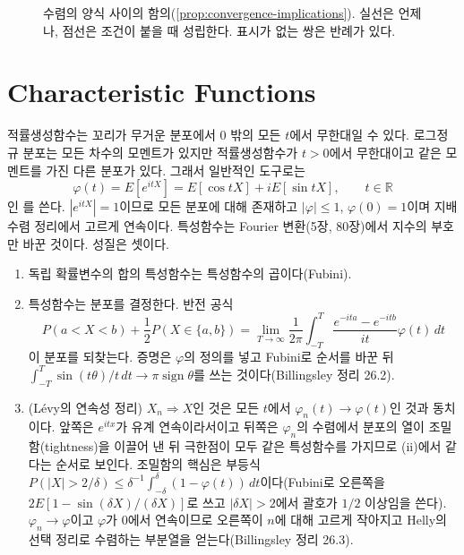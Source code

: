 \begin{figure}[htbp]
\centering
{}
\caption{수렴의 양식 사이의 함의(\cref{prop:convergence-implications}). 실선은 언제나, 점선은 조건이 붙을 때 성립한다. 표시가 없는 쌍은 반례가 있다.}
\label{fig:convergence}
\end{figure}

\section{Characteristic Functions}
\label{sec:characteristic-function}

적률생성함수는 꼬리가 무거운 분포에서 $0$ 밖의 모든 $t$에서 무한대일 수 있다. 로그정규 분포는 모든 차수의 모멘트가 있지만 적률생성함수가 $t>0$에서 무한대이고 같은 모멘트를 가진 다른 분포가 있다. 그래서 일반적인 도구로는
\[
\varphi(t)=E[e^{itX}]=E[\cos tX]+iE[\sin tX],\qquad t\in\mathbb R
\]
인 를 쓴다. $|e^{itX}|=1$이므로 모든 분포에 대해 존재하고 $|\varphi|\le1$, $\varphi(0)=1$이며 지배 수렴 정리에서 고르게 연속이다. 특성함수는 Fourier 변환(5장, 80장)에서 지수의 부호만 바꾼 것이다. 성질은 셋이다.
\begin{enumerate}
\item 독립 확률변수의 합의 특성함수는 특성함수의 곱이다(Fubini).
\item 특성함수는 분포를 결정한다. 반전 공식
\[
P(a<X<b)+\frac12P(X\in\{a,b\})=\lim_{T\to\infty}\frac1{2\pi}\int_{-T}^T\frac{e^{-ita}-e^{-itb}}{it}\varphi(t)\,dt
\]
이 분포를 되찾는다. 증명은 $\varphi$의 정의를 넣고 Fubini로 순서를 바꾼 뒤 $\int_{-T}^T\sin(t\theta)/t\,dt\to\pi\operatorname{sign}\theta$를 쓰는 것이다(Billingsley\cite{billingsley1995} 정리 26.2).
\item (Lévy의 연속성 정리) $X_n\Rightarrow X$인 것은 모든 $t$에서 $\varphi_n(t)\to\varphi(t)$인 것과 동치이다. 앞쪽은 $e^{itx}$가 유계 연속이라서이고 뒤쪽은 $\varphi_n$의 수렴에서 분포의 열이 조밀함(tightness)을 이끌어 낸 뒤 극한점이 모두 같은 특성함수를 가지므로 (ii)에서 같다는 순서로 보인다. 조밀함의 핵심은 부등식 $P(|X|>2/\delta)\le\delta^{-1}\int_{-\delta}^\delta(1-\varphi(t))\,dt$이다(Fubini로 오른쪽을 $2E[1-\sin(\delta X)/(\delta X)]$로 쓰고 $|\delta X|>2$에서 괄호가 $1/2$ 이상임을 쓴다). $\varphi_n\to\varphi$이고 $\varphi$가 $0$에서 연속이므로 오른쪽이 $n$에 대해 고르게 작아지고 Helly의 선택 정리로 수렴하는 부분열을 얻는다(Billingsley\cite{billingsley1995} 정리 26.3).
\end{enumerate}

